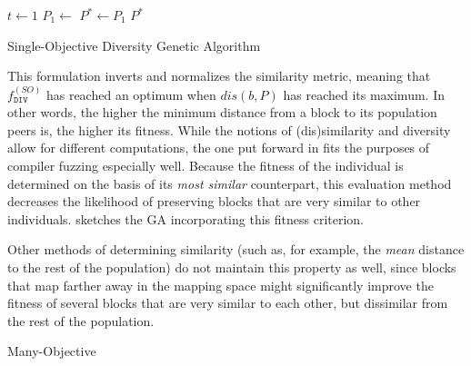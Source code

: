 \begin{algorithm}[t]

	\BlankLine
	\DontPrintSemicolon
	$t \leftarrow 1$\;
	$P_1 \leftarrow $ \;
	$P^{*} \leftarrow P_1$\;
	\Return $P^{*}$

	\caption{Single-Objective Diversity Genetic Algorithm}
	\label{alg:sodga}
\end{algorithm}


This formulation inverts and normalizes the similarity metric, meaning that
$f^{(SO)}_{\texttt{DIV}}$ has reached an optimum when $dis(b, P)$ has reached its maximum.
In other words, the higher the minimum distance from a block to its population peers is,
the higher its fitness.
While the notions of (dis)similarity and diversity allow for different computations,
the one put forward in  fits the purposes of compiler fuzzing
especially well.
Because the fitness of the individual is determined on the basis of its \textit{most similar}
counterpart, this evaluation method decreases the likelihood of preserving blocks
that are very similar to other individuals.
 sketches the \gls{GA} incorporating this fitness criterion.

Other methods of determining similarity (such as, for example, the \textit{mean}
distance to the rest of the population) do not maintain this property as well,
since blocks that map farther away in the mapping space might significantly
improve the fitness of several blocks that are very similar to each other, but
dissimilar from the rest of the population.

  {Many-Objective}

